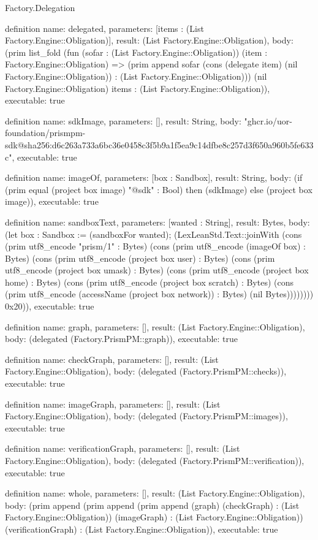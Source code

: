 \begin{lexlean}{Factory.Delegation}
\begin{semanticmodule}
definition{
  name: delegated,
  parameters: [items : (List Factory.Engine::Obligation)],
  result: (List Factory.Engine::Obligation),
  body: (prim list_fold (fun (sofar : (List Factory.Engine::Obligation)) (item : Factory.Engine::Obligation) => (prim append sofar (cons (delegate item) (nil Factory.Engine::Obligation)) : (List Factory.Engine::Obligation))) (nil Factory.Engine::Obligation) items : (List Factory.Engine::Obligation)),
  executable: true
}

definition{
  name: sdkImage,
  parameters: [],
  result: String,
  body: "ghcr.io/uor-foundation/prismpm-sdk@sha256:d6c263a733a6bc36e0458c3f5b9a1f5ea9c14dfbe8c257d3f650a960b5fe633c",
  executable: true
}

definition{
  name: imageOf,
  parameters: [box : Sandbox],
  result: String,
  body: (if (prim equal (project box image) "@sdk" : Bool) then (sdkImage) else (project box image)),
  executable: true
}

definition{
  name: sandboxText,
  parameters: [wanted : String],
  result: Bytes,
  body: (let box : Sandbox := (sandboxFor wanted); (LexLeanStd.Text::joinWith (cons (prim utf8_encode "prism/1" : Bytes) (cons (prim utf8_encode (imageOf box) : Bytes) (cons (prim utf8_encode (project box user) : Bytes) (cons (prim utf8_encode (project box umask) : Bytes) (cons (prim utf8_encode (project box home) : Bytes) (cons (prim utf8_encode (project box scratch) : Bytes) (cons (prim utf8_encode (accessName (project box network)) : Bytes) (nil Bytes)))))))) 0x20)),
  executable: true
}

definition{
  name: graph,
  parameters: [],
  result: (List Factory.Engine::Obligation),
  body: (delegated (Factory.PrismPM::graph)),
  executable: true
}

definition{
  name: checkGraph,
  parameters: [],
  result: (List Factory.Engine::Obligation),
  body: (delegated (Factory.PrismPM::checks)),
  executable: true
}

definition{
  name: imageGraph,
  parameters: [],
  result: (List Factory.Engine::Obligation),
  body: (delegated (Factory.PrismPM::images)),
  executable: true
}

definition{
  name: verificationGraph,
  parameters: [],
  result: (List Factory.Engine::Obligation),
  body: (delegated (Factory.PrismPM::verification)),
  executable: true
}

definition{
  name: whole,
  parameters: [],
  result: (List Factory.Engine::Obligation),
  body: (prim append (prim append (prim append (graph) (checkGraph) : (List Factory.Engine::Obligation)) (imageGraph) : (List Factory.Engine::Obligation)) (verificationGraph) : (List Factory.Engine::Obligation)),
  executable: true
}


\end{semanticmodule}
\end{lexlean}
